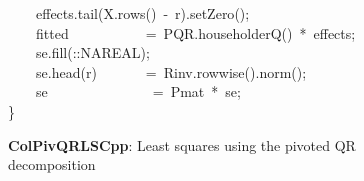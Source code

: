 \documentclass[shortnames,article]{jss}
\newcommand{\hlstd}[1]{\textcolor[rgb]{0,0,0}{#1}}
\newcommand{\hlopt}[1]{\textcolor[rgb]{0,0,0}{#1}}
\newcommand{\hlkwd}[1]{\textcolor[rgb]{0,0,0}{#1}}
\begin{document}
\begin{figure}[htb]
    \hlstd{}\hlstd{\ \ \ \ }\hlstd{effects}\hlopt{.}\hlstd{}\hlkwd{tail}\hlstd{}\hlopt{(}\hlstd{X}\hlopt{.}\hlstd{}\hlkwd{rows}\hlstd{}\hlopt{()\ {-}\ }\hlstd{r}\hlopt{).}\hlstd{}\hlkwd{setZero}\hlstd{}\hlopt{();}\hspace*{\fill}\\
    \hlstd{}\hlstd{\ \ \ \ }\hlstd{fitted}\hlstd{\ \ \ \ \ \ \ \ \ \ \ }\hlstd{}\hlopt{=\ }\hlstd{PQR}\hlopt{.}\hlstd{}\hlkwd{householderQ}\hlstd{}\hlopt{()\ {*}\ }\hlstd{effects}\hlopt{;}\hspace*{\fill}\\
    \hlstd{}\hlstd{\ \ \ \ }\hlstd{se}\hlopt{.}\hlstd{}\hlkwd{fill}\hlstd{}\hlopt{(::}\hlstd{NA\textunderscore REAL}\hlopt{);}\hspace*{\fill}\\
    \hlstd{}\hlstd{\ \ \ \ }\hlstd{se}\hlopt{.}\hlstd{}\hlkwd{head}\hlstd{}\hlopt{(}\hlstd{r}\hlopt{)}\hlstd{\ \ \ \ \ \ \ }\hlopt{=\ }\hlstd{Rinv}\hlopt{.}\hlstd{}\hlkwd{rowwise}\hlstd{}\hlopt{().}\hlstd{}\hlkwd{norm}\hlstd{}\hlopt{();}\hspace*{\fill}\\
    \hlstd{}\hlstd{\ \ \ \ }\hlstd{se}\hlstd{\ \ \ \ \ \ \ \ \ \ \ \ \ \ \ }\hlstd{}\hlopt{=\ }\hlstd{Pmat\ }\hlopt{{*}\ }\hlstd{se}\hlopt{;}\hspace*{\fill}\\
    \hlstd{}\hlopt{\}}\hlstd{}\hspace*{\fill}\\
    \mbox{}
    \normalfont
    \normalsize
  \caption{\textbf{ColPivQRLSCpp}: Least squares using the pivoted QR decomposition}
  \label{ColPivQRLS}
\end{figure}

\end{document}
